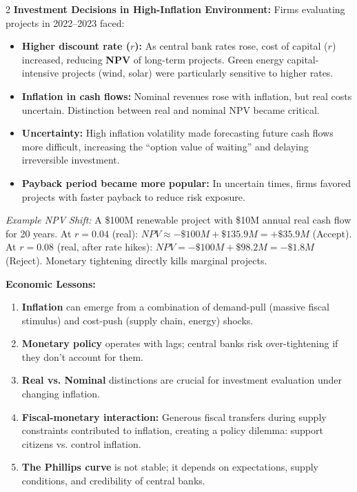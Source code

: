 \documentclass[10pt,a4paper]{article}
\begin{document}
\begin{multicols}{2}
\textbf{Investment Decisions in High-Inflation Environment:}
Firms evaluating projects in 2022--2023 faced:
\begin{itemize}[leftmargin=*,nosep]
    \item \textbf{Higher discount rate ($r$):} As central bank rates rose, cost of capital ($r$) increased, reducing \textbf{NPV} of long-term projects. Green energy capital-intensive projects (wind, solar) were particularly sensitive to higher rates.
    \item \textbf{Inflation in cash flows:} Nominal revenues rose with inflation, but real costs uncertain. Distinction between real and nominal NPV became critical.
    \item \textbf{Uncertainty:} High inflation volatility made forecasting future cash flows more difficult, increasing the ``option value of waiting'' and delaying irreversible investment.
    \item \textbf{Payback period became more popular:} In uncertain times, firms favored projects with faster payback to reduce risk exposure.
\end{itemize}
\textit{Example NPV Shift:} A \$100M renewable project with \$10M annual real cash flow for 20 years. At $r = 0.04$ (real): $NPV \approx -\$100M + \$135.9M = +\$35.9M$ (Accept). At $r = 0.08$ (real, after rate hikes): $NPV = -\$100M + \$98.2M = -\$1.8M$ (Reject). Monetary tightening directly kills marginal projects.

\textbf{Economic Lessons:}
\begin{enumerate}[leftmargin=*,nosep]
    \item \textbf{Inflation} can emerge from a combination of demand-pull (massive fiscal stimulus) and cost-push (supply chain, energy) shocks.
    \item \textbf{Monetary policy} operates with lags; central banks risk over-tightening if they don't account for them.
    \item \textbf{Real vs. Nominal} distinctions are crucial for investment evaluation under changing inflation.
    \item \textbf{Fiscal-monetary interaction:} Generous fiscal transfers during supply constraints contributed to inflation, creating a policy dilemma: support citizens vs. control inflation.
    \item \textbf{The Phillips curve} is not stable; it depends on expectations, supply conditions, and credibility of central banks.
\end{enumerate}


\end{multicols}
\end{document}
